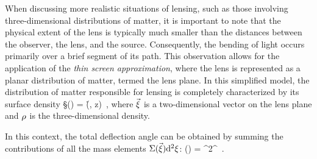 When discussing more realistic situations of lensing, such as those involving three-dimensional distributions of matter, it is important to note that the physical extent of the lens is typically much smaller than the distances between the observer, the lens, and the source. Consequently, the bending of light occurs primarily over a brief segment of its path. This observation allows for the application of the \emph{thin screen approximation}, where the lens is represented as a planar distribution of matter, termed the lens plane. In this simplified model, the distribution of matter responsible for lensing is completely characterized by its surface density
\be
\label{eq:2.7}
\S (\va{\x}) = \int \r (\va{\x}, z)  \,,
\ee
where $\va{\xi}$ is a two-dimensional vector on the lens plane and $\rho$ is the three-dimensional density.

In this context, the total deflection angle can be obtained by summing the contributions of all the mass elements $\Sigma (\va{\xi}) \dd^2{\xi}$:
\be
\label{eq:2.8}
\hat{\va{\a}} (\va{\x}) =  \int {} \dd^2{\x^\prime} \,.
\ee